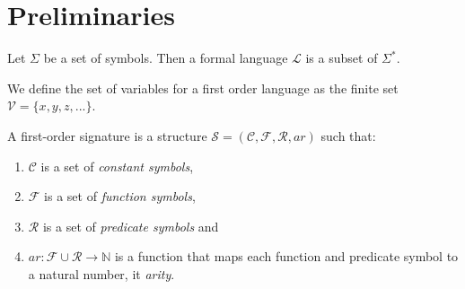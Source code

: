 \chapter{Preliminaries}

\begin{definition} \label{def:formal-language}
    Let $\Sigma$ be a set of symbols. Then a formal language $\mathcal{L}$ is a subset of $\Sigma^*$.
\end{definition}


\begin{definition}[variables]\label{def:FO-variables}
    We define the set of variables for a first order language as the finite set $\mathcal{V} = \{x,y,z,...\}$.
\end{definition}

\begin{definition}\label{def:FO-signature}
    A first-order signature is a structure $\mathcal{S} = (\mathcal{C},\mathcal{F},\mathcal{R},ar)$ such that:
    \begin{enumerate}
        \item $\mathcal{C}$ is a set of \textit{constant symbols},
        \item $\mathcal{F}$ is a set of \textit{function symbols},
        \item $\mathcal{R}$ is a set of \textit{predicate symbols} and
        \item $ar : \mathcal{F} \cup \mathcal{R} \to \mathbb{N}$ is a function that maps each function and predicate symbol to a natural number, it \textit{arity}.
    \end{enumerate}
\end{definition}

